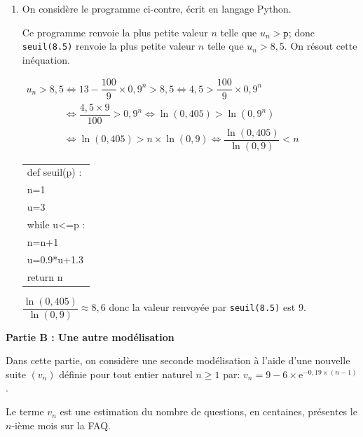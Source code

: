\documentclass[10pt]{article}
\providecommand{\N}{\mathbb{N}}
\providecommand{\e}{{\mathrm{e}}}
\begin{document}
\begin{enumerate}
donc la suite $(u_n)_{n\in\N*}$ est croissante.

\item On considère le programme ci-contre, écrit en langage Python.

\begin{minipage}{0.72\linewidth}



Ce programme renvoie la plus petite valeur $n$ telle que $u_n>\texttt{p}$; donc \texttt{seuil(8.5)} renvoie la plus petite valeur $n$ telle que $u_n>8,5$. On résout cette inéquation.

$\begin{gathered}u_n>8,5
\iff
13 -\dfrac{100}{9}\times 0,9^n > 8,5
\iff
4,5 > \dfrac{100}{9}\times 0,9^n\\
\phantom{u_n>8,5}
\iff
\dfrac{4,5\times 9}{100}> 0,9^n
\iff
\ln(0,405) > \ln \left (0,9^n\right )\\
\phantom{u_n>8,5}
\iff
\ln(0,405) >n \times \ln  (0,9)
\iff
\dfrac{\ln(0,405)}{\ln(0,9)} <n\end{gathered}$
\end{minipage}\hfill
\begin{minipage}{0.25\linewidth}
\renewcommand\arraystretch{0.9}
\begin{tabularx}{\linewidth}{|X|} \hline
def seuil(p) :\\
\qquad n=1\\
\qquad u=3\\
\qquad while u<=p :\\
\qquad  \qquad n=n+1\\
\qquad \qquad u=0.9*u+1.3 \\
\qquad return n\\ \hline
\end{tabularx}
\end{minipage}

$\dfrac{\ln(0,405)}{\ln(0,9)} \approx 8,6$ donc la valeur renvoyée par \texttt{seuil(8.5)} est 9.
\end{enumerate}

\bigskip

\textbf{Partie B : Une autre modélisation}

\medskip

Dans cette partie, on considère une seconde modélisation à l'aide d'une nouvelle
suite $\left(v_n\right)$ définie pour tout entier naturel $n \geqslant 1$ par:
$v_n = 9 - 6 \times \e^{-0,19\times(n - 1)}$.

Le terme $v_n$ est une estimation du nombre de questions, en centaines, présentes le $n$-ième mois sur la FAQ.
\end{document}

